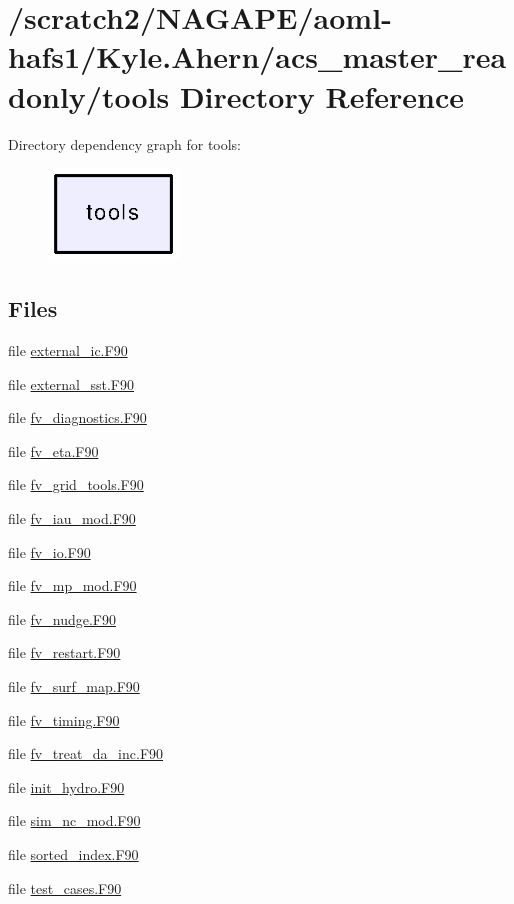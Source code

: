 \section{/scratch2/\-N\-A\-G\-A\-P\-E/aoml-\/hafs1/\-Kyle.Ahern/acs\-\_\-master\-\_\-readonly/tools Directory Reference}
\label{dir_4eeb864c4eec08c7d6b9d3b0352cfdde}
Directory dependency graph for tools\-:
\nopagebreak
\begin{figure}[H]
\begin{center}
\leavevmode
\includegraphics[width=98pt]{dir_4eeb864c4eec08c7d6b9d3b0352cfdde_dep}
\end{center}
\end{figure}
\subsection*{Files}
\begin{DoxyCompactItemize}
\item 
file \hyperlink{external__ic_8F90}{external\-\_\-ic.\-F90}
\item 
file \hyperlink{external__sst_8F90}{external\-\_\-sst.\-F90}
\item 
file \hyperlink{fv__diagnostics_8F90}{fv\-\_\-diagnostics.\-F90}
\item 
file \hyperlink{fv__eta_8F90}{fv\-\_\-eta.\-F90}
\item 
file \hyperlink{fv__grid__tools_8F90}{fv\-\_\-grid\-\_\-tools.\-F90}
\item 
file \hyperlink{fv__iau__mod_8F90}{fv\-\_\-iau\-\_\-mod.\-F90}
\item 
file \hyperlink{fv__io_8F90}{fv\-\_\-io.\-F90}
\item 
file \hyperlink{fv__mp__mod_8F90}{fv\-\_\-mp\-\_\-mod.\-F90}
\item 
file \hyperlink{fv__nudge_8F90}{fv\-\_\-nudge.\-F90}
\item 
file \hyperlink{fv__restart_8F90}{fv\-\_\-restart.\-F90}
\item 
file \hyperlink{fv__surf__map_8F90}{fv\-\_\-surf\-\_\-map.\-F90}
\item 
file \hyperlink{fv__timing_8F90}{fv\-\_\-timing.\-F90}
\item 
file \hyperlink{fv__treat__da__inc_8F90}{fv\-\_\-treat\-\_\-da\-\_\-inc.\-F90}
\item 
file \hyperlink{init__hydro_8F90}{init\-\_\-hydro.\-F90}
\item 
file \hyperlink{sim__nc__mod_8F90}{sim\-\_\-nc\-\_\-mod.\-F90}
\item 
file \hyperlink{sorted__index_8F90}{sorted\-\_\-index.\-F90}
\item 
file \hyperlink{test__cases_8F90}{test\-\_\-cases.\-F90}
\end{DoxyCompactItemize}
